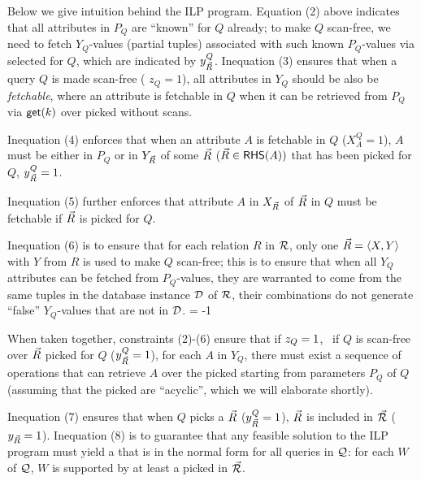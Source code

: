  \vspace{0.6ex}
Below we give intuition behind the ILP program.
Equation (2) above indicates that all
attributes in $P_{Q}$ are ``known'' for $Q$ already; to make
$Q$ scan-free, we need to fetch $Y_{Q}$-values (partial tuples) associated
with such known $P_{Q}$-values via selected \bss for
$Q$, which are indicated by $y_{\vec{R}}^{Q}$.
Inequation (3) ensures that when a query $Q$ is made scan-free (\ie
$z_{Q} = 1$), all attributes in $Y_{Q}$ should be also be
{\em fetchable}, where an attribute is fetchable in $Q$
when it can be retrieved from $P_{Q}$ via $\protect\mathsf{get}(k)$ over picked
\bss without scans.


\vspace{0.6ex}
Inequation (4) enforces that when an attribute $A$ is fetchable in
$Q$ (\ie $X_{A}^{Q} = 1$), $A$ must be either in $P_{Q}$ or
in $Y_{\vec{R}}$ of some \bs $\vec{R}$ ($\vec{R} \in {\ensuremath {\mathsf{RHS}}}(A))$
that has been picked for $Q$, \ie $y_{\vec{R}}^{Q} = 1$.

Inequation (5) further enforces that attribute $A$ in $X_{\vec{R}}$
of $\vec{R}$ in $Q$ must be fetchable if $\vec{R}$ is picked for $Q$.

\vspace{0.6ex}
Inequation (6) is to ensure that for each relation $R$ in ${\mathcal R}$,
only one \bs $\vec{R} \allowbreak =\allowbreak \langle X,\allowbreak Y\rangle$ with $Y$ from $R$ is used
to make $Q$ scan-free; this is to ensure that when all $Y_{Q}$ attributes
can be fetched from $P_{Q}$-values, they are warranted to come from
the same tuples in the database instance $\mathcal D$ of ${\mathcal R}$, \ie their
combinations do not generate ``false'' $Y_{Q}$-values that are
not in $\mathcal D$.
\looseness = -1

\vspace{0.8ex}
When taken together,
constraints (2)-(6) ensure that if $z_{Q}\allowbreak
=\allowbreak 1$, \ie~if $Q$ is scan-free over \bss $\vec{R}$ picked for $Q$
($y_{\vec{R}}^{Q}\allowbreak =\allowbreak 1$), for each $A$ in $Y_{Q}$,
there must exist a sequence of \get operations that can retrieve
$A$ over the picked \bss starting from parameters $P_{Q}$ of $Q$
(assuming that the picked \bss are ``acyclic'', which we will
elaborate shortly).

\vspace{0.6ex}
Inequation (7) ensures that when $Q$ picks a \bs $\vec{R}$
($y_{\vec{R}}^{Q} = 1$), $\vec{R}$ is included in \bds $\vec{{\mathcal R}}$
($y_{\vec{R}} = 1$).
%
Inequation (8) is to guarantee that any feasible solution to the
ILP program must yield a \bds that is in the normal form for all
queries in $\mathcal Q$: for each \qcs $W$ of $\mathcal Q$, $W$ is supported by
at least a \bs picked in $\vec{{\mathcal R}}$.

